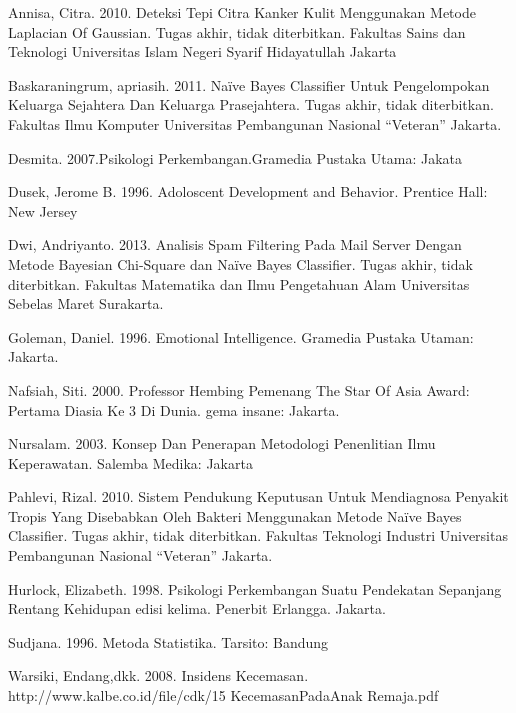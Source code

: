 \documentclass{jtetiproposalskripsi}
\begin{document}
\begin{thebibliography}{9}

Annisa, Citra. 2010. Deteksi Tepi Citra Kanker Kulit Menggunakan Metode Laplacian Of Gaussian. Tugas akhir, tidak diterbitkan. Fakultas Sains dan Teknologi Universitas Islam Negeri Syarif Hidayatullah Jakarta

Baskaraningrum, apriasih. 2011. Naïve Bayes Classifier Untuk Pengelompokan Keluarga Sejahtera Dan Keluarga Prasejahtera. Tugas akhir, tidak diterbitkan. Fakultas Ilmu Komputer Universitas Pembangunan Nasional “Veteran” Jakarta.

Desmita. 2007.Psikologi Perkembangan.Gramedia Pustaka Utama: Jakata

Dusek, Jerome B. 1996. Adoloscent Development and Behavior. Prentice Hall: New Jersey

Dwi, Andriyanto. 2013. Analisis Spam Filtering Pada Mail Server Dengan Metode Bayesian Chi-Square dan Naïve Bayes Classifier. Tugas akhir, tidak diterbitkan. Fakultas Matematika dan Ilmu Pengetahuan Alam Universitas Sebelas Maret Surakarta.

Goleman, Daniel. 1996. Emotional Intelligence. Gramedia Pustaka Utaman: Jakarta.

Nafsiah, Siti. 2000. Professor Hembing Pemenang The Star Of Asia Award: Pertama Diasia Ke 3 Di Dunia. gema insane: Jakarta.

Nursalam. 2003. Konsep  Dan Penerapan Metodologi Penenlitian Ilmu Keperawatan. Salemba Medika: Jakarta

Pahlevi, Rizal. 2010. Sistem Pendukung Keputusan Untuk Mendiagnosa Penyakit Tropis Yang Disebabkan Oleh Bakteri Menggunakan Metode Naïve Bayes Classifier. Tugas akhir, tidak diterbitkan. Fakultas Teknologi Industri Universitas Pembangunan Nasional “Veteran” Jakarta.

Hurlock, Elizabeth. 1998. Psikologi Perkembangan Suatu Pendekatan Sepanjang Rentang Kehidupan edisi kelima. Penerbit Erlangga. Jakarta.

Sudjana. 1996. Metoda Statistika. Tarsito: Bandung

Warsiki, Endang,dkk. 2008. Insidens Kecemasan. http://www.kalbe.co.id/file/cdk/15 KecemasanPadaAnak Remaja.pdf

\end{thebibliography}
\end{document}
